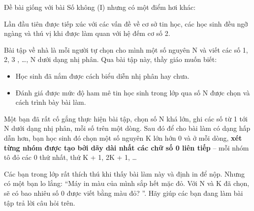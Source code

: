 Đề bài giống với bài Số không (I) nhưng có một điểm hơi khác:

Lần đầu tiên được tiếp xúc với các vấn đề về cơ sở tin học, các học sinh đều ngỡ ngàng và thú vị khi được làm quan với hệ đếm cơ số 2.

Bài tập về nhà là mỗi người tự chọn cho mình một số nguyên N và viết các số 1, 2, 3 , …, N dưới dạng nhị phân. Qua bài tập này, thầy giáo muốn biết:
\begin{itemize}
	\item Học sinh đã nắm được cách biểu diễn nhị phân hay chưa.
	\item Đánh giá được mức độ ham mê tin học sinh trong lớp qua số N được chọn và cách trình bày bài làm.
\end{itemize}

Một bạn đã rất cố gắng thực hiện bài tập, chọn số N khá lớn, ghi các số từ 1 tới N dưới dạng nhị phân, mỗi số trên một dòng. Sau đó để cho bài làm có dạng hấp dẫn hơn, bạn học sinh đó chọn một số nguyên K lớn hớn 0 và ở mỗi dòng, \textbf{xét từng nhóm được tạo bởi dãy dài nhất các chữ số 0 liên tiếp} – mỗi nhóm tô đỏ các 0 thứ nhất, thứ K + 1, 2K + 1, …

Các bạn trong lớp rất thích thú khi thấy bài làm này và định in để nộp. Nhưng có một bạn lo lắng: “Máy in màu của mình sắp hết mặc đỏ. Với N và K đã chọn, sẽ có bao nhiêu số 0 được viết bằng màu đỏ? ”. Hãy giúp các bạn đang làm bài tập trả lời câu hỏi trên.